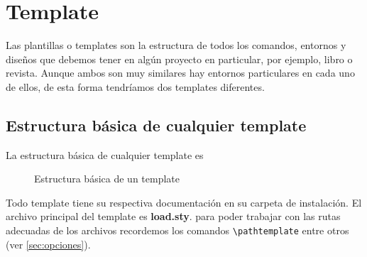 {\justifying
	\chapter{Template}\label{cap:Template}
	Las plantillas o templates son la estructura de todos los comandos, entornos y diseños que debemos tener en algún proyecto en particular, por ejemplo, libro o revista. Aunque ambos son muy similares hay entornos particulares en cada uno de ellos, de esta forma tendríamos dos templates diferentes.
	\section{Estructura básica de cualquier template}
	La estructura básica de cualquier template es 
	\begin{figure}[H]
		\caption{Estructura básica de un template}
		\label{fig:EstructuraTemplate}
	\end{figure}
	Todo template tiene su respectiva documentación en su carpeta de instalación.\pap
	El archivo principal del template es \textbf{load.sty}. para poder trabajar con las rutas adecuadas de los archivos recordemos los comandos \verb|\pathtemplate| entre otros (ver \ref{sec:opciones}). 
}